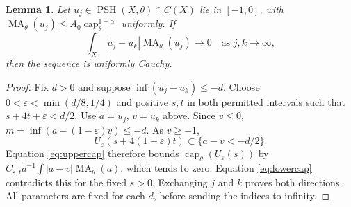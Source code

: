 \documentclass[11pt]{article}
\newcommand{\MA}{\operatorname{MA}}
\newcommand{\capH}{\operatorname{cap}}
\newcommand{\PSH}{\operatorname{PSH}}
\newtheorem{lemma}[theorem]{Lemma}
\theoremstyle{remark}\newtheorem{remark}[theorem]{Remark}
\begin{document}
\begin{lemma}\label{lem:stability}
Let $u_j\in\PSH(X,\theta)\cap C(X)$ lie in $[-1,0]$, with
$\MA_\theta(u_j)\leq A_0\capH_\theta^{1+\alpha}$ uniformly.
If
\[
 \int_X|u_j-u_k|\MA_\theta(u_j)\longrightarrow0
 \quad\text{as }j,k\longrightarrow\infty,
\]
then the sequence is uniformly Cauchy.
\end{lemma}
\begin{proof}
Fix $d>0$ and suppose $\inf(u_j-u_k)\leq-d$.
Choose $0<\varepsilon<\min(d/8,1/4)$ and positive $s,t$ in both
permitted intervals such that $s+4t+\varepsilon<d/2$.
Use $a=u_j$, $v=u_k$ above. Since $v\leq0$,
$m=\inf(a-(1-\varepsilon)v)\leq-d$. As $v\geq-1$,
\[
 U_\varepsilon(s+4(1-\varepsilon)t)
        \subset\{a-v<-d/2\}.
\]
Equation \eqref{eq:uppercap} therefore bounds
$\capH_\theta(U_\varepsilon(s))$ by
$C_{\varepsilon,t}d^{-1}\int|a-v|\MA_\theta(a)$,
which tends to zero. Equation \eqref{eq:lowercap} contradicts this
for the fixed $s>0$. Exchanging $j$ and $k$ proves both directions.
All parameters are fixed for each $d$, before sending the indices
to infinity.
\end{proof}
\end{document}
